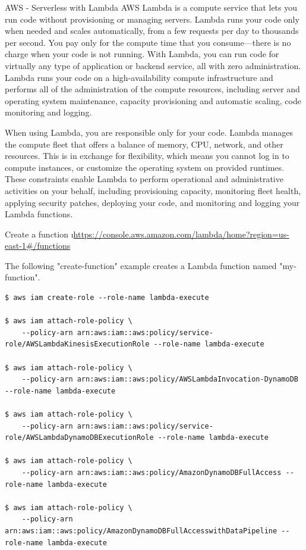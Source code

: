 \begin{frame}{AWS - Serverless with Lambda}
AWS Lambda is a compute service that lets you run code without provisioning or managing servers.
Lambda runs your code only when needed and scales automatically, from a few requests per day
to thousands per second. You pay only for the compute time that you consume—there is no charge
when your code is not running. With Lambda, you can run code for virtually any type of application or
backend service, all with zero administration. Lambda runs your code on a high-availability compute
infrastructure and performs all of the administration of the compute resources, including server and
operating system maintenance, capacity provisioning and automatic scaling, code monitoring and
logging.

When using Lambda, you are responsible only for your code. Lambda manages the compute fleet that
offers a balance of memory, CPU, network, and other resources. This is in exchange for flexibility, which
means you cannot log in to compute instances, or customize the operating system on provided runtimes.
These constraints enable Lambda to perform operational and administrative activities on your behalf,
including provisioning capacity, monitoring fleet health, applying security patches, deploying your code,
and monitoring and logging your Lambda functions.

Create a function
\i \url{https://console.aws.amazon.com/lambda/home?region=us-east-1#/functions}

The following "create-function" example creates a Lambda function
named "my-function".
\begin{lstlisting}
$ aws iam create-role --role-name lambda-execute

$ aws iam attach-role-policy \
    --policy-arn arn:aws:iam::aws:policy/service-role/AWSLambdaKinesisExecutionRole --role-name lambda-execute

$ aws iam attach-role-policy \
    --policy-arn arn:aws:iam::aws:policy/AWSLambdaInvocation-DynamoDB --role-name lambda-execute

$ aws iam attach-role-policy \
    --policy-arn arn:aws:iam::aws:policy/service-role/AWSLambdaDynamoDBExecutionRole --role-name lambda-execute

$ aws iam attach-role-policy \
    --policy-arn arn:aws:iam::aws:policy/AmazonDynamoDBFullAccess --role-name lambda-execute

$ aws iam attach-role-policy \
    --policy-arn arn:aws:iam::aws:policy/AmazonDynamoDBFullAccesswithDataPipeline --role-name lambda-execute


\end{lstlisting}
\end{frame}
